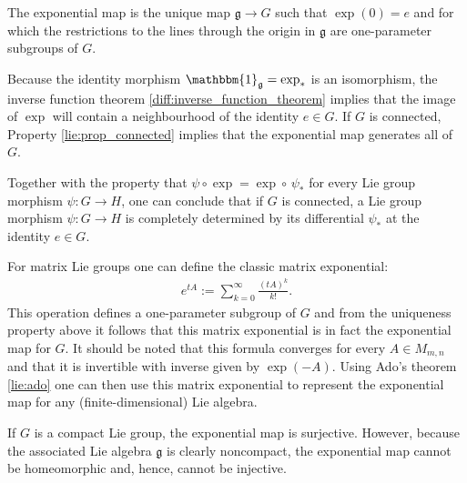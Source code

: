     \begin{property}[Uniqueness]
        The exponential map is the unique map $\mathfrak{g}\rightarrow G$ such that $\exp(0) = e$ and for which the restrictions to the lines through the origin in $\mathfrak{g}$ are one-parameter subgroups of $G$.
    \end{property}
    \begin{result}\label{lie:exp_result}
        Because the identity morphism $\mathbbm{1}_\mathfrak{g}=\exp_\ast$ is an isomorphism, the inverse function theorem \ref{diff:inverse_function_theorem} implies that the image of $\exp$ will contain a neighbourhood of the identity $e\in G$. If $G$ is connected, Property \ref{lie:prop_connected} implies that the exponential map generates all of $G$.

        Together with the property that $\psi\circ\exp = \exp\circ\,\psi_\ast$ for every Lie group morphism $\psi:G\rightarrow H$, one can conclude that if $G$ is connected, a Lie group morphism $\psi:G\rightarrow H$ is completely determined by its differential $\psi_\ast$ at the identity $e\in G$.
    \end{result}

    \begin{example}
        For matrix Lie groups one can define the classic matrix exponential:
        \begin{gather}
            e^{tA} := \sum_{k=0}^\infty\frac{(tA)^k}{k!}.
        \end{gather}
        This operation defines a one-parameter subgroup of $G$ and from the uniqueness property above it follows that this matrix exponential is in fact the exponential map for $G$. It should be noted that this formula converges for every $A\in M_{m,n}$ and that it is invertible with inverse given by $\exp(-A)$. Using Ado's theorem \ref{lie:ado} one can then use this matrix exponential to represent the exponential map for any (finite-dimensional) Lie algebra.
    \end{example}
    \begin{remark}
        If $G$ is a compact Lie group, the exponential map is surjective. However, because the associated Lie algebra $\mathfrak{g}$ is clearly noncompact, the exponential map cannot be homeomorphic and, hence, cannot be injective.
    \end{remark}

